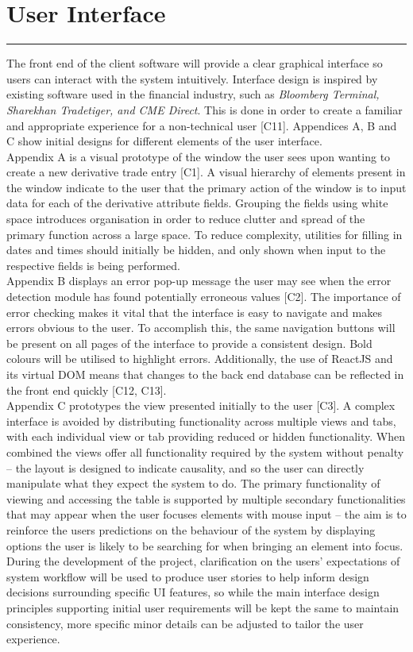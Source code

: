 \documentclass{article}
\begin{document}
\section*{User Interface}
\hrule
\vspace{9pt}
The front end of the client software will provide a clear graphical interface so users can interact with the system intuitively. Interface design is inspired by existing software used in the financial industry, such as \textit{Bloomberg Terminal, Sharekhan Tradetiger, and CME Direct}. This is done in order to create a familiar and appropriate experience for a non-technical user [C11].  Appendices A, B and C show initial designs for different elements of the user interface. 
\\
Appendix A is a visual prototype of the window the user sees upon wanting to create a new derivative trade entry [C1]. A visual hierarchy of elements present in the window indicate to the user that the primary action of the window is to input data for each of the derivative attribute fields. Grouping the fields using white space introduces organisation in order to reduce clutter and spread of the primary function across a large space. To reduce complexity, utilities for filling in dates and times should initially be hidden, and only shown when input to the respective fields is being performed.
\\
Appendix B displays an error pop-up message the user may see when the error detection module has found potentially erroneous values [C2]. The importance of error checking makes it vital that the interface is easy to navigate and makes errors obvious to the user. To accomplish this, the same navigation buttons will be present on all pages of the interface to provide a consistent design. Bold colours will be utilised to highlight errors. Additionally, the use of ReactJS and its virtual DOM means that changes to the back end database can be reflected in the front end quickly [C12, C13]. 
\\
Appendix C prototypes the view presented initially to the user [C3]. A complex interface is avoided by distributing functionality across multiple views and tabs, with each individual view or tab providing reduced or hidden functionality. When combined the views offer all functionality required by the system without penalty – the layout is designed to indicate causality, and so the user can directly manipulate what they expect the system to do. The primary functionality of viewing and accessing the table is supported by multiple secondary functionalities that may appear when the user focuses elements with mouse input – the aim is to reinforce the users predictions on the behaviour of the system by displaying options the user is likely to be searching for when bringing an element into focus. 
\\
During the development of the project, clarification on the users’ expectations of system workflow will be used to produce user stories to help inform design decisions surrounding specific UI features, so while the main interface design principles supporting initial user requirements will be kept the same to maintain consistency, more specific minor details can be adjusted to tailor the user experience. 
\end{document}
